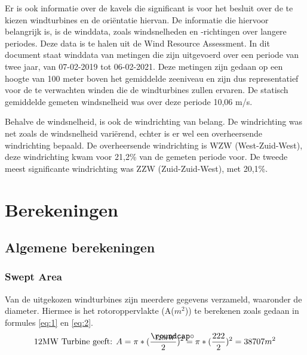 Er is ook informatie over de kavels die significant is voor het besluit over de te kiezen windturbines en de oriëntatie hiervan. De informatie die hiervoor belangrijk is, is de winddata, zoals windsnelheden en -richtingen over langere periodes. Deze data is te halen uit de Wind Resource Assessment.\cite{WindResourceAssessment} In dit document staat winddata van metingen die zijn uitgevoerd over een periode van twee jaar, van 07-02-2019 tot 06-02-2021. Deze metingen zijn gedaan op een hoogte van 100 meter boven het gemiddelde zeeniveau en zijn dus representatief voor de te verwachten winden die de windturbines zullen ervaren. De statisch gemiddelde gemeten windsnelheid was over deze periode 10,06 m/s. 

Behalve de windsnelheid, is ook de windrichting van belang. De windrichting was net zoals de windsnelheid variërend, echter is er wel een overheersende windrichting bepaald. De overheersende windrichting is WZW (West-Zuid-West), deze windrichting kwam voor 21,2\% van de gemeten periode voor. De tweede meest significante windrichting was ZZW (Zuid-Zuid-West), met 20,1\%. 






\section{Berekeningen}
\subsection{Algemene berekeningen}
\subsubsection{Swept Area}
Van de uitgekozen windturbines zijn meerdere gegevens verzameld, waaronder de diameter. Hiermee is het rotoroppervlakte (A(\(m^2\))) te berekenen zoals gedaan in formules \ref{eq:1} en \ref{eq:2}.
\begin{equation} \label{eq:1}
\text{12MW Turbine geeft: } A =\pi*(\frac{\slashcirc_{12MW}}{2})^2 = \pi*(\frac{222}{2})^2 = 38707 m^2
\end{equation}

